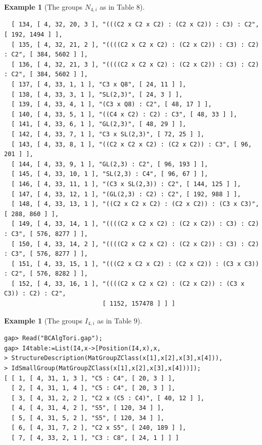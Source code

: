 \documentclass{amsart}
\theoremstyle{plain}
\theoremstyle{definition}
\newtheorem{example}[theorem]{Example}
\theoremstyle{remark}
\begin{document}
\begin{example}[The groups $N_{4,i}$ as in Table $8$]
\begin{verbatim}
  [ 134, [ 4, 32, 20, 3 ], "(((C2 x C2 x C2) : (C2 x C2)) : C3) : C2", [ 192, 1494 ] ], 
  [ 135, [ 4, 32, 21, 2 ], "((((C2 x C2 x C2) : (C2 x C2)) : C3) : C2) : C2", [ 384, 5602 ] ], 
  [ 136, [ 4, 32, 21, 3 ], "((((C2 x C2 x C2) : (C2 x C2)) : C3) : C2) : C2", [ 384, 5602 ] ], 
  [ 137, [ 4, 33, 1, 1 ], "C3 x Q8", [ 24, 11 ] ], 
  [ 138, [ 4, 33, 3, 1 ], "SL(2,3)", [ 24, 3 ] ], 
  [ 139, [ 4, 33, 4, 1 ], "(C3 x Q8) : C2", [ 48, 17 ] ], 
  [ 140, [ 4, 33, 5, 1 ], "((C4 x C2) : C2) : C3", [ 48, 33 ] ], 
  [ 141, [ 4, 33, 6, 1 ], "GL(2,3)", [ 48, 29 ] ], 
  [ 142, [ 4, 33, 7, 1 ], "C3 x SL(2,3)", [ 72, 25 ] ], 
  [ 143, [ 4, 33, 8, 1 ], "((C2 x C2 x C2) : (C2 x C2)) : C3", [ 96, 201 ] ],
  [ 144, [ 4, 33, 9, 1 ], "GL(2,3) : C2", [ 96, 193 ] ], 
  [ 145, [ 4, 33, 10, 1 ], "SL(2,3) : C4", [ 96, 67 ] ], 
  [ 146, [ 4, 33, 11, 1 ], "(C3 x SL(2,3)) : C2", [ 144, 125 ] ], 
  [ 147, [ 4, 33, 12, 1 ], "(GL(2,3) : C2) : C2", [ 192, 988 ] ], 
  [ 148, [ 4, 33, 13, 1 ], "((C2 x C2 x C2) : (C2 x C2)) : (C3 x C3)", [ 288, 860 ] ], 
  [ 149, [ 4, 33, 14, 1 ], "((((C2 x C2 x C2) : (C2 x C2)) : C3) : C2) : C3", [ 576, 8277 ] ], 
  [ 150, [ 4, 33, 14, 2 ], "((((C2 x C2 x C2) : (C2 x C2)) : C3) : C2) : C3", [ 576, 8277 ] ], 
  [ 151, [ 4, 33, 15, 1 ], "(((C2 x C2 x C2) : (C2 x C2)) : (C3 x C3)) : C2", [ 576, 8282 ] ], 
  [ 152, [ 4, 33, 16, 1 ], "((((C2 x C2 x C2) : (C2 x C2)) : (C3 x C3)) : C2) : C2", 
                           [ 1152, 157478 ] ] ]
\end{verbatim}
\end{example}

\bigskip
\begin{example}[The groups $I_{4,i}$ as in Table $9$]~\vspace*{-5mm}\\
\begin{verbatim}
gap> Read("BCAlgTori.gap");
gap> I4table:=List(I4,x->[Position(I4,x),x,
> StructureDescription(MatGroupZClass(x[1],x[2],x[3],x[4])),
> IdSmallGroup(MatGroupZClass(x[1],x[2],x[3],x[4]))]);
[ [ 1, [ 4, 31, 1, 3 ], "C5 : C4", [ 20, 3 ] ], 
  [ 2, [ 4, 31, 1, 4 ], "C5 : C4", [ 20, 3 ] ], 
  [ 3, [ 4, 31, 2, 2 ], "C2 x (C5 : C4)", [ 40, 12 ] ], 
  [ 4, [ 4, 31, 4, 2 ], "S5", [ 120, 34 ] ], 
  [ 5, [ 4, 31, 5, 2 ], "S5", [ 120, 34 ] ], 
  [ 6, [ 4, 31, 7, 2 ], "C2 x S5", [ 240, 189 ] ], 
  [ 7, [ 4, 33, 2, 1 ], "C3 : C8", [ 24, 1 ] ] ]
\end{verbatim}
\end{example}

\end{document}
